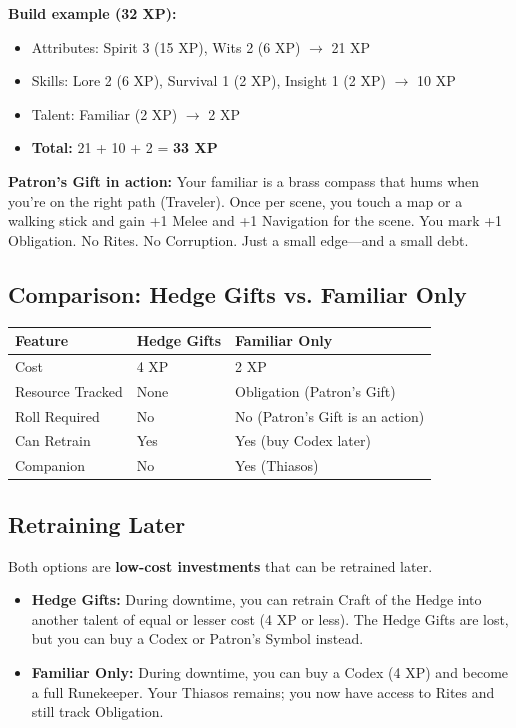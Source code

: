 \textbf{Build example (32 XP):}
\begin{itemize}
  \item Attributes: Spirit 3 (15 XP), Wits 2 (6 XP) $\rightarrow$ 21 XP
  \item Skills: Lore 2 (6 XP), Survival 1 (2 XP), Insight 1 (2 XP) $\rightarrow$ 10 XP
  \item Talent: Familiar (2 XP) $\rightarrow$ 2 XP
  \item \textbf{Total:} 21 + 10 + 2 = \textbf{33 XP}
\end{itemize}

\textbf{Patron's Gift in action:}
Your familiar is a brass compass that hums when you're on the right path (Traveler). Once per scene, you touch a map or a walking stick and gain +1 Melee and +1 Navigation for the scene. You mark +1 Obligation. No Rites. No Corruption. Just a small edge---and a small debt.

\subsection{Comparison: Hedge Gifts vs. Familiar Only}

\begin{center}
\small
\begin{tabular}{lll}
\toprule
\textbf{Feature} & \textbf{Hedge Gifts} & \textbf{Familiar Only} \\
\midrule
Cost & 4 XP & 2 XP \\
Resource Tracked & None & Obligation (Patron's Gift) \\
Roll Required & No & No (Patron's Gift is an action) \\
Can Retrain & Yes & Yes (buy Codex later) \\
Companion & No & Yes (Thiasos) \\
\bottomrule
\end{tabular}
\end{center}

\subsection{Retraining Later}

Both options are \textbf{low-cost investments} that can be retrained later.

\begin{itemize}
  \item \textbf{Hedge Gifts:} During downtime, you can retrain Craft of the Hedge into another talent of equal or lesser cost (4 XP or less). The Hedge Gifts are lost, but you can buy a Codex or Patron's Symbol instead.
  \item \textbf{Familiar Only:} During downtime, you can buy a Codex (4 XP) and become a full Runekeeper. Your Thiasos remains; you now have access to Rites and still track Obligation.
\end{itemize}

